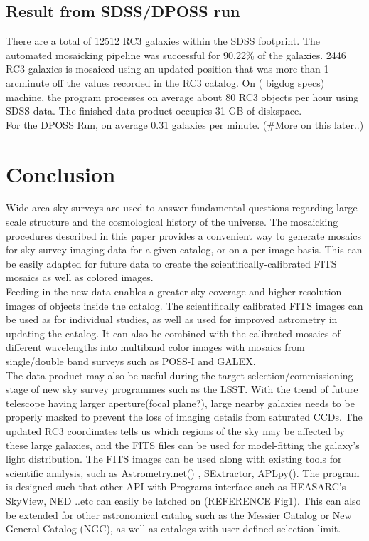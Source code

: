 \documentclass[5p]{elsarticle}
\begin{document}
\subsection{Result from SDSS/DPOSS run}
\indent There are a total of 12512 RC3 galaxies within the SDSS footprint. The automated mosaicking pipeline was  successful for 90.22\% of the galaxies. 2446 RC3 galaxies is mosaiced using an updated position that was more than 1 arcminute off the values recorded in the RC3 catalog.  On ( bigdog specs)  machine, the program processes on average about 80 RC3 objects per hour using SDSS data.  %
The finished data product occupies 31 GB of diskspace. 
\\
\indent  For the DPOSS Run, on average 0.31 galaxies per minute. (\#More on this later..)

 \section{Conclusion}
\indent Wide-area sky surveys are used to answer fundamental questions regarding large-scale structure and the cosmological history of the universe. The mosaicking procedures described in this paper provides a convenient way to generate mosaics for sky survey imaging data for a given catalog, or on a per-image basis. This can be easily adapted for future data to create the scientifically-calibrated FITS mosaics as well as colored images. 
\\
\indent Feeding in the new data enables a greater  sky coverage and higher resolution images of objects inside the catalog. The scientifically calibrated FITS images can be used as for individual studies, as well as used for improved astrometry in updating the catalog. It can also be combined with the calibrated mosaics of different wavelengths into multiband color images with mosaics from single/double band surveys such as POSS-I and GALEX.  %
\\
\indent The data product may also be useful  during  the target selection/commissioning stage of new sky survey programmes such as the LSST. With the trend of future telescope having larger aperture(focal plane?), large nearby galaxies needs to be properly masked to prevent the loss of imaging details from saturated CCDs. The updated RC3 coordinates tells us  which regions of the sky may be affected by these large galaxies, and the FITS files can be used for model-fitting the galaxy's light distribution. The FITS images can be used along with existing tools for scientific analysis, such as Astrometry.net(\citet{astrometry.net}) , SExtractor, APLpy(\citet{aplpy}). The program is designed such that other API with Programs interface such as HEASARC's SkyView, NED ..etc can easily be latched on (REFERENCE Fig1). This can also be extended for other astronomical catalog such as the Messier Catalog or New General Catalog (NGC), as well as catalogs with user-defined selection limit. %
\end{document}
